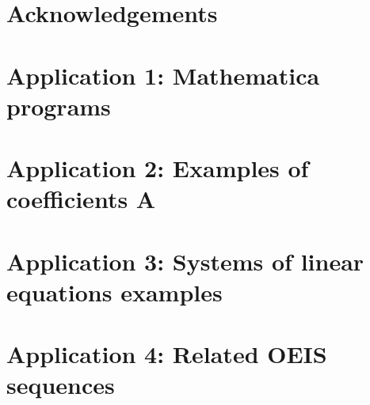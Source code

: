 \documentclass[12pt,letterpaper,oneside,reqno]{amsart}
\begin{document}
    \section*{Acknowledgements}
    

    
    

    

    \clearpage


    \section*{Application 1: Mathematica programs}
    

    \clearpage


    \section*{Application 2: Examples of coefficients A}
    

    \clearpage


    \section*{Application 3: Systems of linear equations examples}
    

    \clearpage


    \section*{Application 4: Related OEIS sequences}
    
\end{document}
